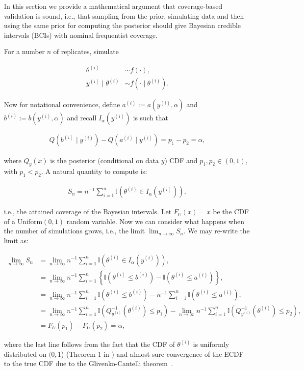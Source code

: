 \documentclass[oneside]{article}
\begin{document}
In this section we provide a mathematical argument that coverage-based validation is sound,  i.e., that sampling from the prior, simulating data and then using the same prior for computing the posterior should give Bayesian credible intervals (BCIs) with nominal frequentist coverage.

For a number $n$ of replicates, simulate

\begin{align*}
\theta^{(i)} &\sim f(\cdot), \\
y^{(i)} \mid \theta^{(i)} &\sim f(\cdot \mid \theta^{(i)}).
\end{align*}

Now  for notational convenience, define $a^{(i)} := a(y^{(i)}, \alpha)$ and $b^{(i)} := b(y^{(i)}, \alpha)$ and recall $I_{\alpha}\left(y^{(i)}\right)$ is such that 

\begin{align*}
Q\left(b^{(i)} \mid y^{(i)}\right) - Q\left(a^{(i)} \mid y^{(i)}\right) = p_1 - p_2 = \alpha,
\end{align*}

\noindent where $Q_{y}(x)$ is the posterior (conditional on data $y$) CDF and $p_1, p_2 \in (0,1)$, with $p_1 < p_2$.
A natural quantity to compute is:

\begin{align*}
S_n = n^{-1}\sum_{i=1}^n \mathbb{I}\left(\theta^{(i)} \in I_{\alpha}\left(y^{(i)}\right) \right),
\end{align*}

\noindent i.e., the attained coverage of the Bayesian intervals.
Let $F_U(x) = x$ be the CDF of a $\operatorname{Uniform(0, 1)}$ random variable. 
Now we can consider what happens when the number of simulations grows, i.e., the limit $\lim_{n \to \infty} S_n$.
We may re-write the limit as:

\begin{align*}
\lim_{n \to \infty} S_n &= \lim_{n \to \infty} n^{-1}\sum_{i=1}^n \mathbb{I}\left(\theta^{(i)} \in I_{\alpha}\left(y^{(i)}\right) \right),\\
&=  \lim_{n \to \infty} n^{-1}\sum_{i=1}^n \left\{ \mathbb{I}\left(\theta^{(i)} \leq b^{(i)} \right) - \mathbb{I}\left(\theta^{(i)} \leq a^{(i)} \right) \right\},\\
&=  \lim_{n \to \infty} n^{-1}\sum_{i=1}^n \mathbb{I}\left(\theta^{(i)} \leq b^{(i)} \right) -  n^{-1}\sum_{i=1}^n\mathbb{I}\left(\theta^{(i)} \leq a^{(i)} \right),\\
&=  \lim_{n \to \infty} n^{-1}\sum_{i=1}^n \mathbb{I}\left(Q_{y^{(i)}}^{-1}\left(\theta^{(i)}\right) \leq p_1 \right) -   \lim_{n \to \infty} n^{-1}\sum_{i=1}^n\mathbb{I}\left(Q_{y^{(i)}}^{-1}\left(\theta^{(i)}\right) \leq p_2 \right),\\
&= F_U(p_1) - F_U(p_2) = \alpha,
\end{align*}

\noindent where the last line follows from the fact that the CDF of $\theta^{(i)}$ is uniformly distributed on $(0, 1$) (Theorem 1 in \cite{Cook2006}) and almost sure convergence of the ECDF to the true CDF due to the  Glivenko-Cantelli theorem~\cite[page 275]{Billingsley1986}.

\end{document}
